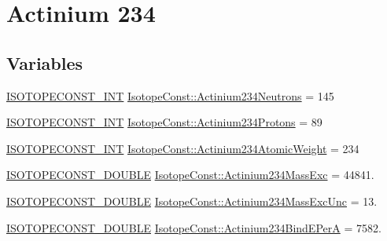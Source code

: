 \hypertarget{group___isotope_const-_actinium-_ac234}{}\section{Actinium 234}
\label{group___isotope_const-_actinium-_ac234}
\subsection*{Variables}
\begin{DoxyCompactItemize}
\item 
\mbox{\hyperlink{group___isotope_const-_macros_ga5f18360b3e99483a35c32d789e62621c}{I\+S\+O\+T\+O\+P\+E\+C\+O\+N\+S\+T\+\_\+\+I\+NT}} \mbox{\hyperlink{group___isotope_const-_actinium-_ac234_ga6a383b847cd844b6a53703132b1c6e10}{Isotope\+Const\+::\+Actinium234\+Neutrons}} = 145
\item 
\mbox{\hyperlink{group___isotope_const-_macros_ga5f18360b3e99483a35c32d789e62621c}{I\+S\+O\+T\+O\+P\+E\+C\+O\+N\+S\+T\+\_\+\+I\+NT}} \mbox{\hyperlink{group___isotope_const-_actinium-_ac234_gadbe895f169810e8ddeda71336f72a9e7}{Isotope\+Const\+::\+Actinium234\+Protons}} = 89
\item 
\mbox{\hyperlink{group___isotope_const-_macros_ga5f18360b3e99483a35c32d789e62621c}{I\+S\+O\+T\+O\+P\+E\+C\+O\+N\+S\+T\+\_\+\+I\+NT}} \mbox{\hyperlink{group___isotope_const-_actinium-_ac234_gafc6430ba1fd954326995d8efc33f55d9}{Isotope\+Const\+::\+Actinium234\+Atomic\+Weight}} = 234
\item 
\mbox{\hyperlink{group___isotope_const-_macros_ga8f45a7272ce02c0b4c65c44636ed719a}{I\+S\+O\+T\+O\+P\+E\+C\+O\+N\+S\+T\+\_\+\+D\+O\+U\+B\+LE}} \mbox{\hyperlink{group___isotope_const-_actinium-_ac234_gab4fd9d6d1c582087609d0c849b3704bf}{Isotope\+Const\+::\+Actinium234\+Mass\+Exc}} = 44841.
\item 
\mbox{\hyperlink{group___isotope_const-_macros_ga8f45a7272ce02c0b4c65c44636ed719a}{I\+S\+O\+T\+O\+P\+E\+C\+O\+N\+S\+T\+\_\+\+D\+O\+U\+B\+LE}} \mbox{\hyperlink{group___isotope_const-_actinium-_ac234_ga49a6e0bdb459f0ecbd66c4b7938aa534}{Isotope\+Const\+::\+Actinium234\+Mass\+Exc\+Unc}} = 13.
\item 
\mbox{\hyperlink{group___isotope_const-_macros_ga8f45a7272ce02c0b4c65c44636ed719a}{I\+S\+O\+T\+O\+P\+E\+C\+O\+N\+S\+T\+\_\+\+D\+O\+U\+B\+LE}} \mbox{\hyperlink{group___isotope_const-_actinium-_ac234_gace67ba8576f895ac2b94d367af3b5b06}{Isotope\+Const\+::\+Actinium234\+Bind\+E\+PerA}} = 7582.
\item 

\end{DoxyCompactItemize}
